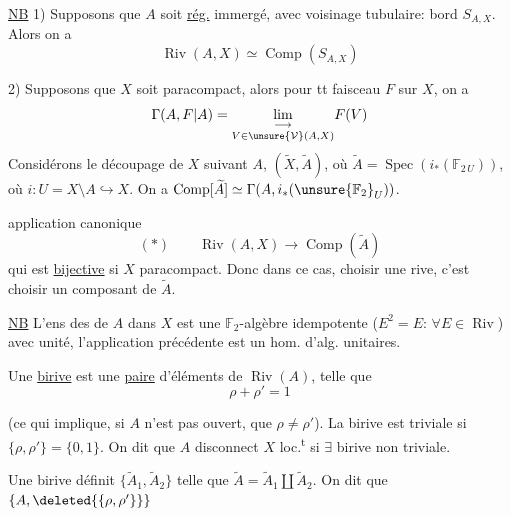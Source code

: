 \uline{NB} 1) Supposons que $A$ soit \uline{rég.} immergé, avec voisinage tubulaire: bord $S_{A,X}$. Alors on a
\[
\operatorname{Riv}(A,X)\simeq\operatorname{Comp}(S_{A,X})
\]

2) Supposons que $X$ soit paracompact, alors pour tt faisceau $F$ sur $X$, on a
\[
\Gamma(A,F|A)=\underset{V\in\unsure{\mathcal V}(A,X)}{\lim_{\longrightarrow}}F(V)
\]
Considérons le découpage de $X$ suivant $A$, $(\widetilde X,\widetilde A)$, où
$\widetilde A=\operatorname{Spec}(i_*(\mathbb F_{2\,U}))$, où $i:U=X\setminus A\hookrightarrow X$.
 On a $\operatorname{Comp}[\widetilde A]\simeq\Gamma(A,i_*({\unsure{\mathbb F_2}}_{U}))$.



application canonique
\[
(*)\qquad \operatorname{Riv}(A,X)\longrightarrow\operatorname{Comp}(\widetilde A)
\]
qui est  \uline{bijective} si $X$ paracompact.
Donc dans ce cas, choisir une rive, c'est choisir un composant de $\widetilde A$.

\uline{NB} L'ens des  de  $A$ dans $X$ est une $\mathbb F_2$-algèbre  idempotente ($E^2=E$: $\forall E\in\operatorname{Riv}$) avec unité, l'application précédente est un hom. d'alg. unitaires.

Une \uline{birive}  est une \uline{paire}  d'éléments de $\operatorname{Riv}(A)$, telle que
\[
\rho+\rho'=1
\]

 (ce qui implique, si $A$ n'est pas ouvert, que $\rho\ne\rho'$).
La birive est triviale si $\{\rho,\rho'\}=\{0,1\}$. On dit que $A$ disconnect $X$ loc.\textsuperscript{t} si $\exists$ birive non triviale.

 Une birive définit $\{\widetilde A_1,\widetilde A_2\}$ telle que $\widetilde A=\widetilde A_1\amalg\widetilde A_2$.
On dit que  $\{A,\deleted{\{\rho,\rho'\}}\}$


